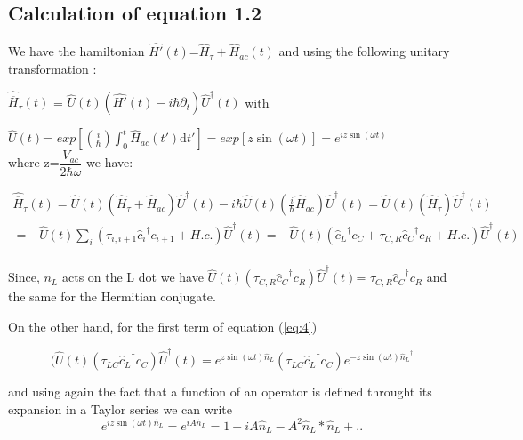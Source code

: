 \subsection{Calculation of equation 1.2} \label{subsection1.1.1}

We have the hamiltonian  $\widehat{H'}(t)$=$\widehat{H}_{\tau}+\widehat{H}_{ac}(t)$ and using the following unitary transformation :
\begin{center}
$\widehat{\overline{H}}_{\tau}(t)$  = $\widehat{U}(t)(\widehat{H'}(t)-i\hbar\partial_t){\widehat{U}}^{\dagger}(t)$  with

 $\widehat{U}(t)$= $ exp \left[  (\frac{i}{\hbar})\int_0^{t} \widehat{H}_{ac} (t') \mathrm{d}t'\right] =exp \left[   z\sin(\omega t) \right] = e^{iz\sin(\omega t) } $
 \\where z=$\dfrac{V_{ac}}{2\hbar\omega}$  we have:
\end{center} 

\begin{multline} \label{eq:12}
\widehat{\overline{H}}_{\tau}(t)= \widehat{U} (t)(\widehat{H}_{\tau}+\widehat{H}_{ac}){\widehat{U}}^{\dagger}(t) - i \hbar\widehat{U}(t)( \frac{i}{\hbar}\widehat{H}_{ac}){\widehat{U}}^{\dagger}(t) 
=\widehat{U} (t)(\widehat{H}_{\tau}){\widehat{U}}^{\dagger}(t) 
\\
= -\widehat{U} (t)\sum_{i} (\tau_{i,i+1}{\widehat{c}_{i}}^{\dagger} c_{i+1} + H.c.){\widehat{U}}^{\dagger}(t) 
= -\widehat{U}(t)({\widehat{c}_{L}}^{\dagger} c_{C}+\tau_{C,R}{\widehat{c}_{C}}^{\dagger} c_{R} + H.c.){\widehat{U}}^{\dagger}(t)
\end{multline}
\\
Since,  $n_L$  acts on the L dot we have $\widehat{U}(t)(\tau_{C,R}{\widehat{c}_{C}}^{\dagger} c_{R}){\widehat{U}}^{\dagger}(t)$= $\tau_{C,R}{\widehat{c}_{C}}^{\dagger} c_{R}$ and the same for the Hermitian conjugate.

On the other hand, for the first term of equation (\ref{eq:4})

\begin{equation} \label{eq:13}
(\widehat{U}(t)(\tau_{ LC}{\widehat{c}_{L}}^{\dagger} c_{C}){\widehat{U}}^{\dagger}(t) =  e^{ z\sin(\omega t) \widehat{n}_L} \left( \tau_{ LC} { \widehat{c}_{L}}^{\dagger} c_{C} \right)  e^{- z\sin(\omega t){\widehat{n}_L}^{\dagger}}
\end{equation}

and using again the fact that a function of an operator is defined throught its expansion in a Taylor series we can write
\begin{equation} \label{eq:14}
e^{ iz\sin(\omega t) \widehat{n}_L} = e^{iA\widehat{n}_L}= 1+iA\widehat{n}_L - A^{2} \widehat{n}_L*\widehat{n}_L +..
\end{equation}

